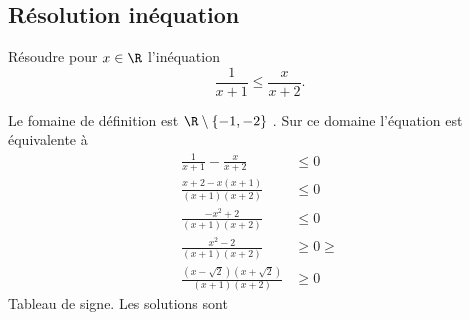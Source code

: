 \subsection{Résolution inéquation}

\begin{exercice}
Résoudre pour $x \in \R$ l'inéquation $$\frac{1}{x+1}\leq \frac{x}{x+2}.$$
\end{exercice}



\begin{correction}
Le fomaine de définition est $\R\setminus\{ -1, -2\}$ . Sur ce domaine l'équation est équivalente à 
\begin{align*}
\frac{1}{x+1}-\frac{x}{x+2}&\leq 0\\
\frac{x+2-x(x+1)}{(x+1)(x+2)}&\leq 0\\
\frac{-x^2+2}{(x+1)(x+2)}&\leq 0\\
\frac{x^2-2}{(x+1)(x+2)}&\geq 0\geq\\
\frac{(x-\sqrt{2})(x+\sqrt{2})}{(x+1)(x+2)}&\geq 0
\end{align*}
Tableau de signe. 
Les solutions sont 
\begin{center}
\fbox{$\cS =]-\infty, -2[\cup [-\sqrt{2}, -1[\cup [\sqrt{2}, +\infty[$. }
\end{center}


\end{correction}
